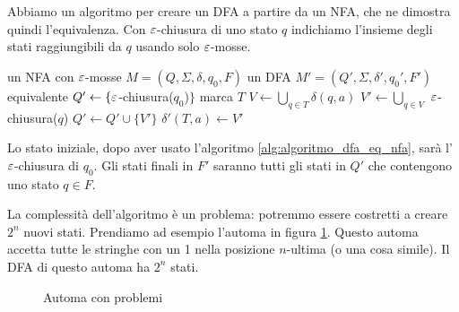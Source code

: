 Abbiamo un algoritmo per creare un DFA a partire da un NFA, che ne dimostra quindi l'equivalenza.
Con $\varepsilon$-chiusura di uno stato $q$ indichiamo l'insieme degli stati raggiungibili da $q$ usando solo $\varepsilon$-mosse.

\begin{algorithm}
	\caption{Algoritmo per creare un DFA a partire da un NFA.}
	\label{alg:algoritmo_dfa_eq_nfa}
	\begin{algorithmic}
		\Require un NFA con $\varepsilon$-mosse $M = (Q, \Sigma, \delta, q_0, F)$
		\Ensure un DFA $M' = (Q', \Sigma, \delta', q_0', F')$ equivalente
		\State $Q' \gets \{ \varepsilon$-chiusura($q_0$)$\}$
			\State marca $T$
				\State $V \gets \bigcup_{q \in T} \delta(q, a)$
				\State $V' \gets \bigcup_{q \in V}$ $\varepsilon$-chiusura($q$)
				\State $Q' \gets Q' \cup \{ V' \}$
				\EndIf
				\State $\delta'(T, a) \gets V'$
			\EndFor
		\EndWhile
	\end{algorithmic}
\end{algorithm}

Lo stato iniziale, dopo aver usato l'algoritmo \ref{alg:algoritmo_dfa_eq_nfa}, sar\`a l'$\varepsilon$-chiusura di $q_0$.
Gli stati finali in $F'$ saranno tutti gli stati in $Q'$ che contengono uno stato $q \in F$.

La complessit\`a dell'algoritmo \`e un problema: potremmo essere costretti a creare $2^n$ nuovi stati.
Prendiamo ad esempio l'automa in figura \ref{fig:nfa_con_problemi}.
Questo automa accetta tutte le stringhe con un 1 nella posizione $n$-ultima (o una cosa simile).
Il DFA di questo automa ha $2^n$ stati.

\begin{figure}
	\centering
	\caption{Automa con problemi}
	\label{fig:nfa_con_problemi}
\end{figure}

